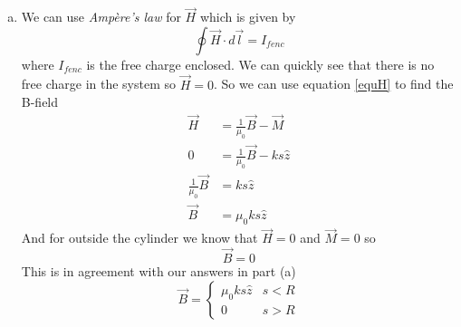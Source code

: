 \documentclass[11pt]{article}
\numberwithin{equation}{section}
\begin{document}
\begin{enumerate}[(a)]
\item
We can use \emph{Amp\`{e}re's law} for $\vec{H}$ which is given by
$$\oint\vec{H}\cdot d\vec{l} = I_{fenc}$$
where $I_{fenc}$ is the free charge enclosed. We can quickly see that there is no free charge in the system so $\vec{H} = 0$. So we can use equation \ref{equH} to find the B-field
\begin{align*}
\vec{H} &= \frac{1}{\mu_0}\vec{B} - \vec{M}\\ 
0 &= \frac{1}{\mu_0}\vec{B} - ks\hat{z}\\ 
\frac{1}{\mu_0}\vec{B} &= ks\hat{z}\\ 
\vec{B} &= \mu_0ks\hat{z}
\end{align*}
And for outside the cylinder we know that $\vec{H}=0$ and $\vec{M} = 0$ so 
$$\vec{B} = 0$$
This is in agreement with our answers in part (a)
$$\vec{B} = \left\{\begin{array}{lc}
	\mu_0ks\hat{z}		&s<R\\
	0			&s>R
		\end{array}\right.$$
\end{enumerate}
\end{document}
